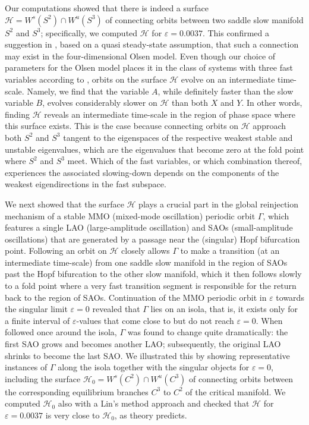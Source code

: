 \documentclass{ws-ijbc}
\begin{document}
Our computations showed that there is indeed a surface $\mathscr{H} = W^s(S^2) \cap W^u(S^3)$ of connecting orbits between two saddle slow manifold $S^2$ and $S^3$; specifically, we computed $\mathscr{H}$ for $\varepsilon = 0.0037$. This confirmed a suggestion in \cite{QSSA}, based on a quasi steady-state assumption, that such a connection may exist in the four-dimensional Olsen model. Even though our choice of parameters for the Olsen model places it in the class of systems with three fast variables according to \cite{Rescaling}, orbits on the surface $\mathscr{H}$ evolve on an intermediate time-scale. Namely, we find that the variable $A$, while definitely faster than the slow variable $B$, evolves considerably slower on $\mathscr{H}$ than both $X$ and $Y$. In other words, finding $\mathscr{H}$ reveals an intermediate time-scale in the region of phase space where this surface exists. This is the case because connecting orbits on $\mathscr{H}$ approach both $S^2$ and $S^3$ tangent to the eigenspaces of the respective weakest stable and unstable eigenvalues, which are the eigenvalues that become zero at the fold point where $S^2$ and $S^3$ meet. Which of the fast variables, or which combination thereof, experiences the associated slowing-down depends on the components of the weakest eigendirections in the fast subspace. 

We next showed that the surface $\mathscr{H}$ plays a crucial part in the global reinjection mechanism of a stable MMO (mixed-mode oscillation) periodic orbit $\Gamma$, which features a single LAO (large-amplitude oscillation) and SAOs (small-amplitude oscillations) that are generated by a passage near the (singular) Hopf bifurcation point. Following an orbit on $\mathscr{H}$ closely allows $\Gamma$ to make a transition (at an intermediate time-scale) from one saddle slow manifold in the region of SAOs past the Hopf bifurcation to the other slow manifold, which it then follows slowly to a fold point where a very fast transition segment is responsible for the return back to the region of SAOs. Continuation of the MMO periodic orbit in $\varepsilon$ towards the singular limit $\varepsilon = 0$ revealed that $\Gamma$ lies on an isola, that is, it exists only for a finite interval of $\varepsilon$-values that come close to but do not reach $\varepsilon = 0$. When followed once around the isola, $\Gamma$ was found to change quite dramatically: the first SAO grows and becomes another LAO; subsequently, the original LAO shrinks to become the last SAO. We illustrated this by showing representative instances of $\Gamma$ along the isola together with the singular objects for $\varepsilon = 0$, including the surface $\mathscr{H}_0 = W^s(C^2) \cap W^u(C^3)$ of connecting orbits between the corresponding equilibrium branches $C^3$ to $C^2$ of the critical manifold. We computed $\mathscr{H}_0$ also with a Lin's method approach and checked that $\mathscr{H}$ for $\varepsilon = 0.0037$ is very close to $\mathscr{H}_0$, as theory predicts. 
\end{document}
